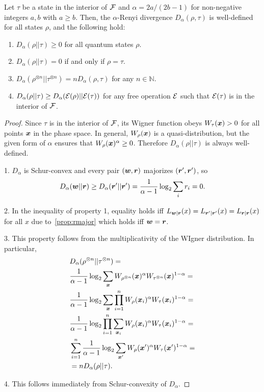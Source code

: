\documentclass[pra,
aps,
twocolumn,
superscriptaddress,
groupedaddress,
nofootinbib,
reprint
]{revtex4-1}
\begin{document}
\begin{theorem}\label{thm:Da_props} 
	Let $\tau$ be a state in the interior of ${\mathcal F}$ and $\alpha = 2a / (2b-1)$ for non-negative integers $a,b$ with $a \geq b$.
Then, the $\alpha$-Renyi divergence $D_\alpha(\rho, \tau)$ is well-defined for all states $\rho$, and the following hold:
\begin{enumerate}
\item $D_\alpha(\rho || \tau) \ge 0$ for all quantum states $\rho$.
\item  $D_\alpha(\rho || \tau) = 0$ if and only if $\rho =\tau$.
\item $D_\alpha(\rho^{\otimes n} || \tau^{\otimes n}) = n D_\alpha(\rho, \tau)$ for any $n \in \mathbb{N}$.
\item $D_\alpha(\rho || \tau) \geq D_\alpha ({\mathcal E}(\rho) || {\mathcal E}(\tau))$ for any free operation ${\mathcal E}$ such that ${\mathcal E}(\tau)$ is in the interior of ${\mathcal F}$.
\end{enumerate}
\end{theorem}
\begin{proof}
	Since $\tau$ is in the interior of ${\mathcal F}$, its Wigner function obeys $W_\tau(\boldsymbol{x}) >0$ for all points $\boldsymbol{x}$ in the phase space. 
In general, $W_\rho(\boldsymbol{x})$ is a quasi-distribution, but the given form of $\alpha$ ensures that $W_{\rho}(\bm{x})^\alpha \geq 0$. 
Therefore $D_\alpha (\rho || \tau)$ is always well-defined.

1. $D_\alpha$ is Schur-convex and every pair $(\boldsymbol{w}, \boldsymbol{r})$ majorizes $(\boldsymbol{r}', \boldsymbol{r}')$, so
\begin{equation}
	D_\alpha(\boldsymbol{w} || \boldsymbol{r}) \geq D_\alpha(\boldsymbol{r}' || \boldsymbol{r}') = \frac{1}{\alpha-1} \log_2 \sum_{i} r_i = 0.
\end{equation}

2. In the inequality of property 1, equality holds iff $L_{\boldsymbol{w}|\boldsymbol{r}}(x) = L_{\boldsymbol{r}'|\boldsymbol{r}'}(x) = L_{\boldsymbol{r}|\boldsymbol{r}}(x)$ for all $x$ due to~\cref{prop:rmajor} which holds iff $\boldsymbol{w} = \boldsymbol{r}$.

3. This property follows from the multiplicativity of the WIgner distribution.
In particular,
\begin{align}
	&D_\alpha(\rho^{\otimes n} || \tau^{\otimes n}) = \nonumber\\
	&\frac{1}{\alpha - 1} \log_2 \sum_{\bm{x}} W_{\rho^{\otimes n}}(\bm{x})^\alpha W_{\tau^{\otimes n}}(\bm{x})^{1-\alpha} = \nonumber\\
	&\frac{1}{\alpha - 1} \log_2 \sum_{\bm{x}} \prod_{i=1}^n W_{\rho}(\bm{x}_i)^\alpha W_{\tau}(\bm{x}_i)^{1-\alpha} = \nonumber\\
	&\frac{1}{\alpha - 1} \log_2 \prod_{i=1}^n \sum_{\bm{x}_i} W_{\rho}(\bm{x}_i)^\alpha W_{\tau}(\bm{x}_i)^{1-\alpha} = \nonumber\\
	&\sum_{i=1}^n \frac{1}{\alpha - 1} \log_2 \sum_{\bm{x}'} W_{\rho}(\bm{x}')^\alpha W_{\tau}(\bm{x}')^{1-\alpha} = \nonumber\\
	&= n D_{\alpha}(\rho || \tau).
\end{align}

4. This follows immediately from Schur-convexity of $D_\alpha$.
\end{proof}
\end{document}
